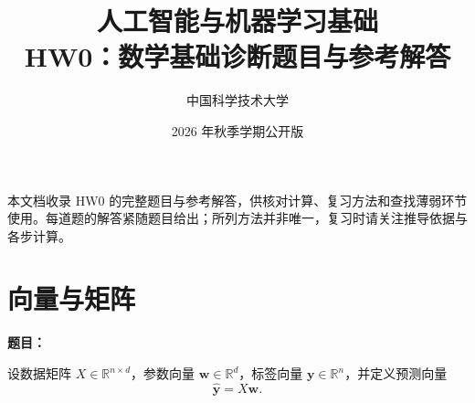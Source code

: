\documentclass[11pt,a4paper]{article}
\title{\vspace{-1.4cm}\textbf{人工智能与机器学习基础\\HW0：数学基础诊断题目与参考解答}}
\author{中国科学技术大学}
\date{2026 年秋季学期\quad 公开版}
\newcommand{\R}{\mathbb{R}}
\newenvironment{question}{%
  \par\begingroup\color{black!82}\noindent\textbf{题目：}\ignorespaces
}{%
  \par\endgroup\smallskip
}
\begin{document}
\maketitle
\pagestyle{fancy}
\thispagestyle{fancy}

本文档收录 HW0 的完整题目与参考解答，供核对计算、复习方法和查找薄弱环节使用。每道题的解答紧随题目给出；所列方法并非唯一，复习时请关注推导依据与各步计算。

\section{向量与矩阵}

\begin{question}
设数据矩阵 $X\in\R^{n\times d}$，参数向量 $\bm w\in\R^d$，标签向量
$\bm y\in\R^n$，并定义预测向量
\[
  \hat{\bm y}=X\bm w.
\]
\end{question}
\end{document}
